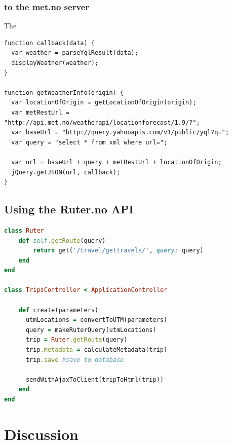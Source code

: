 \documentclass[10pt,a4paper]{article}
\begin{document}
\subsubsection{to the met.no server}
\label{sec:met.no-api}
The 
\begin{lstlisting}[caption=Using YQL API and met.no API to access met.no server, label=lst:metno]
function callback(data) {
  var weather = parseYqlResult(data);
  displayWeather(weather);
}

function getWeatherInfo(origin) {
  var locationOfOrigin = getLocationOfOrigin(origin);
  var metRestUrl = "http://api.met.no/weatherapi/locationforecast/1.9/?";
  var baseUrl = "http://query.yahooapis.com/v1/public/yql?q=";
  var query = "select * from xml where url=";
  
  var url = baseUrl + query + metRestUrl + locationOfOrigin;
  jQuery.getJSON(url, callback);
}

\end{lstlisting}
\subsection{Using the Ruter.no API}
\label{sec:using-ruter.no-api}


\begin{lstlisting}[caption=Using Ruter.no API to access Ruter.no server, label=lst:ruter, language=Ruby]
class Ruter
	def self.getRoute(query)
		return get('/travel/gettravels/', query: query)
	end
end

class TripsController < ApplicationController

    def create(parameters)
      utmLocations = convertToUTM(parameters)
      query = makeRuterQuery(utmLocations)
      trip = Ruter.getRoute(query)
      trip.metadata = calculateMetadata(trip)
      trip.save #save to database
      
      sendWithAjaxToClient(tripToHtml(trip))
    end
end
\end{lstlisting}



\section{Discussion}
\end{document}
